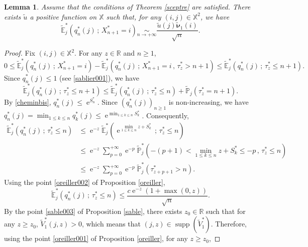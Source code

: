 \documentclass[12pt]{amsart}
\newtheorem{lemma}[theorem]{Lemma}
\theoremstyle{definition}
\numberwithin{equation}{section}
\def\bb#1{\mathbb{#1}}
\def\tt#1{\tilde{#1}}
\def\tbs#1{\tilde{\boldsymbol{#1}}}
\def\tbb#1{\tilde{\mathbb{#1}}}
\def\geq{\geqslant}
\def\leq{\leqslant}
\DeclareMathOperator{\e}{e}
\DeclareMathOperator{\supp}{supp}
\begin{document}
\begin{lemma} Assume that the conditions of Theorem \ref{sceptre} are satisfied.
\label{dieu}
There exists $\tt u$ a positive function on $\bb X$ such that, for any $(i,j) \in \bb X^2$, we have
\[
\tbb E_j^* \left( q_n^*(j) \,;\, X_{n+1}^* = i \right) \underset{n\to+\infty}{\sim} \frac{\tt u(j) \tbs \nu_1(i)}{\sqrt{n}}.
\]
\end{lemma}

\begin{proof}
Fix $(i,j) \in \bb X^2$. For any $z \in \bb R$ and $n \geq 1$,
\begin{equation}
\label{gourmand001}
0 \leq \tbb E_j^* \left( q_n^*(j) \,;\, X_{n+1}^* = i \right) - \tbb E_j^* \left( q_n^*(j) \,;\, X_{n+1}^* = i \,,\, \tau_z^* > n+1 \right) \leq \tbb E_j^* \left( q_n^*(j) \,;\, \tau_z^* \leq n+1 \right).
\end{equation}
Since $q_n^*(j) \leq 1$ (see \eqref{sablier001}), we have
\begin{equation}
\label{bonheur001}
\tbb E_j^* \left( q_n^*(j) \,;\, \tau_z^* \leq n+1 \right) \leq \tbb E_j^* \left( q_n^*(j) \,;\, \tau_z^* \leq n \right) + \tbb P_j \left( \tau_z^* = n+1 \right).
\end{equation}
By \eqref{cheminbis}, $q_n^*(j) \leq \e^{S_n^*}$. Since $( q_n^*(j) )_{n\geq 1}$ is non-increasing, we have $q_n^*(j) = \min_{1\leq k \leq n} q_k^*(j) \leq \e^{\min_{1\leq k \leq n} S_k^*}$. Consequently,
\begin{align*}
\tbb E_j^* \left( q_n^*(j) \,;\, \tau_z^* \leq n \right) &\leq \e^{-z} \tbb E_j^* \left( \e^{\min_{1\leq k \leq n}  z+S_k^*} \,;\, \tau_z^* \leq n \right) \\
&\leq \e^{-z} \sum_{p=0}^{+\infty} \e^{-p}\tbb P_j^* \left( -(p+1) < \min_{1\leq k \leq n} z+S_k^* \leq -p \,,\, \tau_z^* \leq n \right) \\
&\leq \e^{-z} \sum_{p=0}^{+\infty} \e^{-p}\tbb P_j^* \left( \tau_{z+p+1}^* > n \right).
\end{align*}
Using the point \ref{oreiller002} of Proposition \ref{oreiller},
\begin{equation}
\label{bonheur002}
\tbb E_j^* \left( q_n^*(j) \,;\, \tau_z^* \leq n \right) \leq \frac{c \e^{-z} \left( 1+\max(0,z) \right)}{\sqrt{n}}.
\end{equation}
By the point \ref{sable003} of Proposition \ref{sable}, there exists $z_0 \in \bb R$ such that for any $z \geq z_0$, $\tt V_1^*(j,z) > 0$, which means that $(j,z) \in \supp(\tt V_1^*)$. 
Therefore, using the point \ref{oreiller001} of Proposition \ref{oreiller}, for any $z\geq z_0$,

\end{proof}
\end{document}
